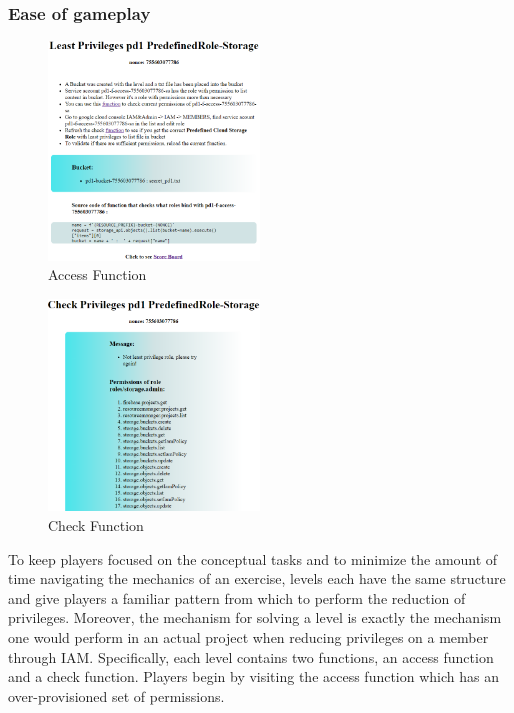 \subsubsection{Ease of gameplay}
\begin{figure}[!h]
  \centering
  \includegraphics[width=0.5\textwidth]{pic/access}
  \caption {Access Function}
  \label{fig:access}
\end{figure}
\begin{figure}[!h]
  \centering
  \includegraphics[width=0.5\textwidth]{pic/check}
  \caption {Check Function}
  \label{fig:check}
\end{figure}
To keep players focused on the conceptual tasks and to minimize the amount of time navigating the mechanics of
an exercise, levels each have the same structure and give players a familiar pattern from which to perform the reduction of privileges.
Moreover, the mechanism for solving a level is exactly the mechanism one would perform in an actual project when reducing privileges
on a member through IAM.  Specifically, each level contains two functions, an access function and a check function.
Players begin by visiting the access function which has an over-provisioned set of permissions.

